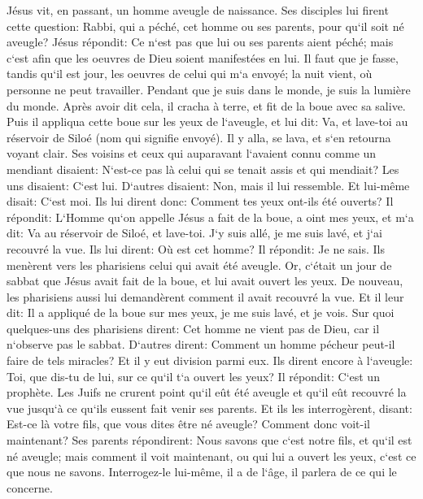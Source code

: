 \verse Jésus vit, en passant, un homme aveugle de naissance. 
\verse Ses disciples lui firent cette question: Rabbi, qui a péché, cet homme ou ses parents, pour qu`il soit né aveugle? 
\verse Jésus répondit: Ce n`est pas que lui ou ses parents aient péché; mais c`est afin que les oeuvres de Dieu soient manifestées en lui. 
\verse Il faut que je fasse, tandis qu`il est jour, les oeuvres de celui qui m`a envoyé; la nuit vient, où personne ne peut travailler. 
\verse Pendant que je suis dans le monde, je suis la lumière du monde. 
\verse Après avoir dit cela, il cracha à terre, et fit de la boue avec sa salive. Puis il appliqua cette boue sur les yeux de l`aveugle, 
\verse et lui dit: Va, et lave-toi au réservoir de Siloé (nom qui signifie envoyé). Il y alla, se lava, et s`en retourna voyant clair. 
\verse Ses voisins et ceux qui auparavant l`avaient connu comme un mendiant disaient: N`est-ce pas là celui qui se tenait assis et qui mendiait? 
\verse Les uns disaient: C`est lui. D`autres disaient: Non, mais il lui ressemble. Et lui-même disait: C`est moi. 
\verse Ils lui dirent donc: Comment tes yeux ont-ils été ouverts? 
\verse Il répondit: L`Homme qu`on appelle Jésus a fait de la boue, a oint mes yeux, et m`a dit: Va au réservoir de Siloé, et lave-toi. J`y suis allé, je me suis lavé, et j`ai recouvré la vue. 
\verse Ils lui dirent: Où est cet homme? Il répondit: Je ne sais. 
\verse Ils menèrent vers les pharisiens celui qui avait été aveugle. 
\verse Or, c`était un jour de sabbat que Jésus avait fait de la boue, et lui avait ouvert les yeux. 
\verse De nouveau, les pharisiens aussi lui demandèrent comment il avait recouvré la vue. Et il leur dit: Il a appliqué de la boue sur mes yeux, je me suis lavé, et je vois. 
\verse Sur quoi quelques-uns des pharisiens dirent: Cet homme ne vient pas de Dieu, car il n`observe pas le sabbat. D`autres dirent: Comment un homme pécheur peut-il faire de tels miracles? 
\verse Et il y eut division parmi eux. Ils dirent encore à l`aveugle: Toi, que dis-tu de lui, sur ce qu`il t`a ouvert les yeux? Il répondit: C`est un prophète. 
\verse Les Juifs ne crurent point qu`il eût été aveugle et qu`il eût recouvré la vue jusqu`à ce qu`ils eussent fait venir ses parents. 
\verse Et ils les interrogèrent, disant: Est-ce là votre fils, que vous dites être né aveugle? Comment donc voit-il maintenant? 
\verse Ses parents répondirent: Nous savons que c`est notre fils, et qu`il est né aveugle; 
\verse mais comment il voit maintenant, ou qui lui a ouvert les yeux, c`est ce que nous ne savons. Interrogez-le lui-même, il a de l`âge, il parlera de ce qui le concerne. 

